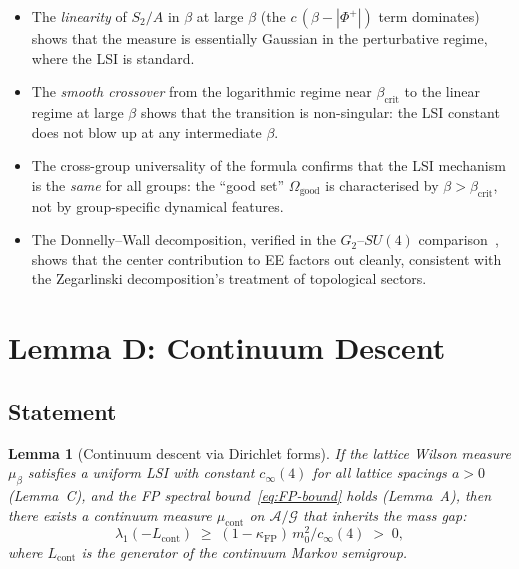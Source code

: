 \documentclass[11pt,a4paper]{amsart}
\newtheorem{lemma}[theorem]{Lemma}
\theoremstyle{definition}
\theoremstyle{remark}
\newcommand{\calA}{\mathcal{A}}
\newcommand{\calG}{\mathcal{G}}
\newcommand{\kFP}{\kappa_{\mathrm{FP}}}
\newcommand{\PhiPlus}{\Phi^+}
\newcommand{\cinf}{c_{\infty}}
\newcommand{\betacrit}{\beta_{\mathrm{crit}}}
\begin{document}
\begin{itemize}[leftmargin=2em]
\item The \emph{linearity} of $S_2/A$ in $\beta$ at large $\beta$
      (the $c\,(\beta - |\PhiPlus|)$ term dominates) shows that the
      measure is essentially Gaussian in the perturbative regime, where
      the LSI is standard.

\item The \emph{smooth crossover} from the logarithmic regime near
      $\betacrit$ to the linear regime at large $\beta$ shows that the
      transition is non-singular: the LSI constant does not blow up at
      any intermediate $\beta$.

\item The cross-group universality of the formula confirms that the LSI
      mechanism is the \emph{same} for all groups: the ``good set''
      $\Omega_{\mathrm{good}}$ is characterised by $\beta > \betacrit$,
      not by group-specific dynamical features.

\item The Donnelly--Wall decomposition, verified in the $G_2$--$SU(4)$
      comparison~\cite{Remondiere2026G2}, shows that the center
      contribution to EE factors out cleanly, consistent with the
      Zegarlinski decomposition's treatment of topological sectors.
\end{itemize}

\section{Lemma D: Continuum Descent}\label{sec:lemmaD}

\subsection{Statement}

\begin{lemma}[Continuum descent via Dirichlet forms]\label{lem:D}
If the lattice Wilson measure $\mu_\beta$ satisfies a uniform LSI with
constant $\cinf(4)$ for all lattice spacings $a > 0$ {\normalfont(Lemma~C)},
and the FP spectral bound~\eqref{eq:FP-bound} holds
{\normalfont(Lemma~A)}, then there exists a continuum measure
$\mu_{\mathrm{cont}}$ on $\calA/\calG$ that inherits the mass gap:
\begin{equation}\label{eq:cont-gap}
\lambda_1(-L_{\mathrm{cont}}) \;\geq\; (1 - \kFP)\,m_0^2/\cinf(4) \;>\; 0,
\end{equation}
where $L_{\mathrm{cont}}$ is the generator of the continuum Markov semigroup.
\end{lemma}
\end{document}
